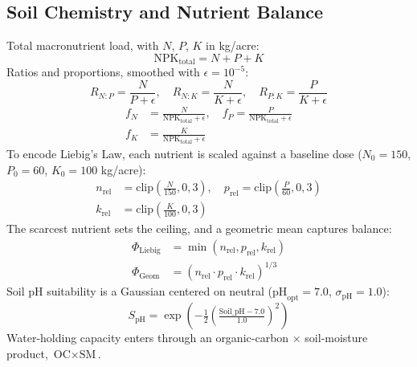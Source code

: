 \documentclass[conference,10pt,letterpaper]{IEEEtran}
\begin{document}
\subsection{Soil Chemistry and Nutrient Balance}
Total macronutrient load, with $N$, $P$, $K$ in kg/acre:
\begin{equation}
\text{NPK}_{\text{total}} = N + P + K
\end{equation}
Ratios and proportions, smoothed with $\epsilon = 10^{-5}$:
\begin{equation}
R_{N:P} = \frac{N}{P + \epsilon}, \quad
R_{N:K} = \frac{N}{K + \epsilon}, \quad
R_{P:K} = \frac{P}{K + \epsilon}
\end{equation}
\begin{equation}
\begin{aligned}
f_N &= \frac{N}{\text{NPK}_{\text{total}} + \epsilon}, \quad
f_P = \frac{P}{\text{NPK}_{\text{total}} + \epsilon} \\
f_K &= \frac{K}{\text{NPK}_{\text{total}} + \epsilon}
\end{aligned}
\end{equation}
To encode Liebig's Law, each nutrient is scaled against a baseline dose ($N_0 = 150$, $P_0 = 60$, $K_0 = 100$ kg/acre):
\begin{equation}
\begin{aligned}
n_{\text{rel}} &= \text{clip}\!\left(\tfrac{N}{150}, 0, 3\right), \quad
p_{\text{rel}} = \text{clip}\!\left(\tfrac{P}{60}, 0, 3\right) \\
k_{\text{rel}} &= \text{clip}\!\left(\tfrac{K}{100}, 0, 3\right)
\end{aligned}
\end{equation}
The scarcest nutrient sets the ceiling, and a geometric mean captures balance:
\begin{align}
\Phi_{\text{Liebig}} &= \min(n_{\text{rel}}, p_{\text{rel}}, k_{\text{rel}}) \\
\Phi_{\text{Geom}}   &= \left(n_{\text{rel}} \cdot p_{\text{rel}} \cdot k_{\text{rel}}\right)^{1/3}
\end{align}
Soil pH suitability is a Gaussian centered on neutral ($\text{pH}_{\text{opt}} = 7.0$, $\sigma_{\text{pH}} = 1.0$):
\begin{equation}
S_{\text{pH}} = \exp\!\left(-\tfrac{1}{2}\left(\tfrac{\text{Soil\_pH} - 7.0}{1.0}\right)^2\right)
\end{equation}
Water-holding capacity enters through an organic-carbon $\times$ soil-moisture product, $\text{OC} \times \text{SM}$.
\end{document}
